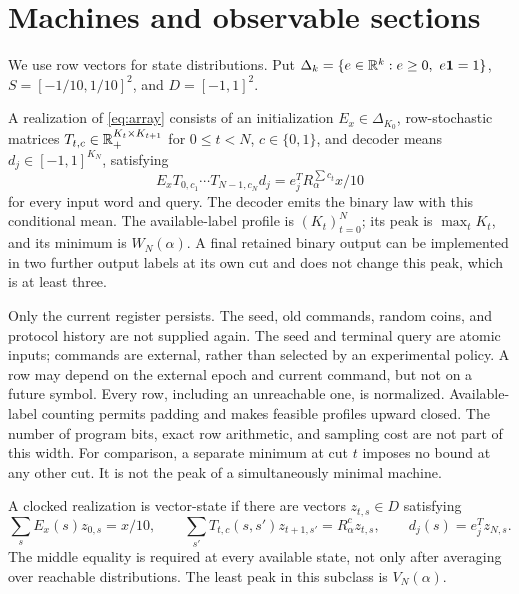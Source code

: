 \section{Machines and observable sections}\label{sec:model}
We use row vectors for state distributions. Put
$\Delta_k=\{e\in\mathbb R^k:e\ge0,\ e\mathbf 1=1\}$,
$S=[-1/10,1/10]^2$, and $D=[-1,1]^2$.

\begin{definition}\label{def:machine}
A realization of \eqref{eq:array} consists of an initialization
$E_x\in\Delta_{K_0}$, row-stochastic matrices
$T_{t,c}\in\mathbb R_+^{K_t\times K_{t+1}}$ for $0\le t<N$, $c\in\{0,1\}$,
and decoder means $d_j\in[-1,1]^{K_N}$, satisfying
\begin{equation}\label{eq:machine}
 E_xT_{0,c_1}\cdots T_{N-1,c_N}d_j
                  =e_j^TR_\alpha^{\sum c_t}x/10
\end{equation}
for every input word and query. The decoder emits the binary law with
this conditional mean. The available-label profile is $(K_t)_{t=0}^N$;
its peak is $\max_tK_t$, and its minimum is $W_N(\alpha)$.
A final retained binary output can be implemented in two further output
labels at its own cut and does not change this peak, which is at least three.
\end{definition}

Only the current register persists. The seed, old commands, random coins,
and protocol history are not supplied again. The seed and terminal query
are atomic inputs; commands are external, rather than selected by an
experimental policy. A row may depend on the external epoch and current
command, but not on a future symbol. Every row, including an unreachable
one, is normalized. Available-label counting permits padding and makes
feasible profiles upward closed. The number of program bits, exact row
arithmetic, and sampling cost are not part of this width.
For comparison, a separate minimum at cut $t$ imposes no bound at any
other cut. It is not the peak of a simultaneously minimal machine.

\begin{definition}\label{def:vector}
A clocked realization is vector-state if there are vectors
$z_{t,s}\in D$ satisfying
\begin{equation}\label{eq:statewise}
 \sum_s E_x(s)z_{0,s}=x/10,\qquad
 \sum_{s'}T_{t,c}(s,s')z_{t+1,s'}=R_\alpha^c z_{t,s},
 \qquad d_j(s)=e_j^Tz_{N,s}.
\end{equation}
The middle equality is required at every available state, not only after
averaging over reachable distributions. The least peak in this subclass
is $V_N(\alpha)$.
\end{definition}

